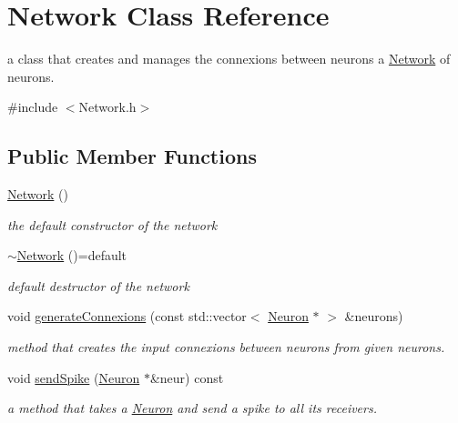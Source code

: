 \hypertarget{classNetwork}{}\section{Network Class Reference}
\label{classNetwork}


a class that creates and manages the connexions between neurons a \hyperlink{classNetwork}{Network} of neurons.  




{\ttfamily \#include $<$Network.\+h$>$}

\subsection*{Public Member Functions}
\begin{DoxyCompactItemize}
\item 
\hyperlink{classNetwork_a3cc2fb4f8fa4d507077e8da85ce5a1c8}{Network} ()
\begin{DoxyCompactList}\small\item\em the default constructor of the network \end{DoxyCompactList}\item 
\hyperlink{classNetwork_ac5138f30f4a492ea6967d18a3ebd1b0f}{$\sim$\+Network} ()=default\hypertarget{classNetwork_ac5138f30f4a492ea6967d18a3ebd1b0f}{}\label{classNetwork_ac5138f30f4a492ea6967d18a3ebd1b0f}

\begin{DoxyCompactList}\small\item\em default destructor of the network \end{DoxyCompactList}\item 
void \hyperlink{classNetwork_ad8b5ad511556baadcbc557f3e7beff69}{generate\+Connexions} (const std\+::vector$<$ \hyperlink{classNeuron}{Neuron} $\ast$ $>$ \&neurons)
\begin{DoxyCompactList}\small\item\em method that creates the input connexions between neurons from given neurons. \end{DoxyCompactList}\item 
void \hyperlink{classNetwork_a8c444d79895bee27bff94aa47bb45733}{send\+Spike} (\hyperlink{classNeuron}{Neuron} $\ast$\&neur) const 
\begin{DoxyCompactList}\small\item\em a method that takes a \hyperlink{classNeuron}{Neuron} and send a spike to all its receivers. \end{DoxyCompactList}\end{DoxyCompactItemize}


